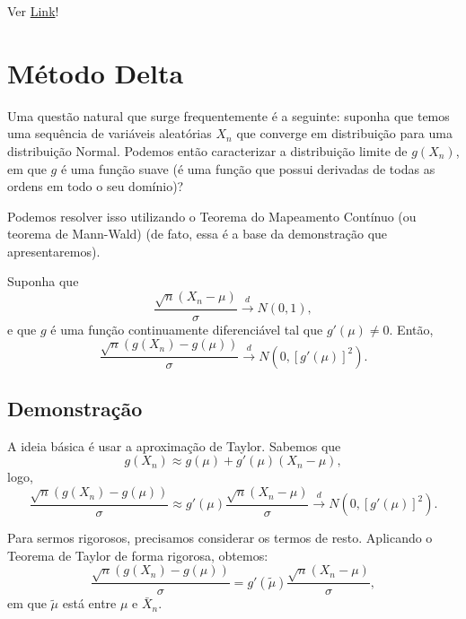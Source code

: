 \documentclass[
  letterpaper,
  DIV=11,
  numbers=noendperiod]{scrreprt}
\begin{document}
Ver
\href{https://www.ime.usp.br/~leorolla/probabilidade/Ch7.S1.html}{Link}!

\section{Método Delta}\label{muxe9todo-delta}

Uma questão natural que surge frequentemente é a seguinte: suponha que
temos uma sequência de variáveis aleatórias \(X_n\) que converge em
distribuição para uma distribuição Normal. Podemos então caracterizar a
distribuição limite de \(g(X_n)\), em que \(g\) é uma função suave (é
uma função que possui derivadas de todas as ordens em todo o seu
domínio)?

Podemos resolver isso utilizando o Teorema do Mapeamento Contínuo (ou
teorema de Mann-Wald) (de fato, essa é a base da demonstração que
apresentaremos).

\begin{tcolorbox}[enhanced jigsaw, colback=white, leftrule=.75mm, colbacktitle=quarto-callout-tip-color!10!white, breakable, titlerule=0mm, bottomtitle=1mm, title=\textcolor{quarto-callout-tip-color}{\faLightbulb}\hspace{0.5em}{Método Delta}, colframe=quarto-callout-tip-color-frame, toprule=.15mm, opacityback=0, bottomrule=.15mm, opacitybacktitle=0.6, arc=.35mm, toptitle=1mm, rightrule=.15mm, coltitle=black, left=2mm]

Suponha que
\[\frac{\sqrt{n}(X_n - \mu)}{\sigma} \xrightarrow{d} N(0,1),\] e que
\(g\) é uma função continuamente diferenciável tal que
\(g'(\mu) \neq 0\). Então,
\[\frac{\sqrt{n}(g(X_n) - g(\mu))}{\sigma} \xrightarrow{d} N\left(0, [g'(\mu)]^2\right).\]

\end{tcolorbox}

\subsection*{Demonstração}\label{demonstrauxe7uxe3o}

A ideia básica é usar a aproximação de Taylor. Sabemos que
\[g(X_n) \approx g(\mu) + g'(\mu)(X_n - \mu),\] logo,
\[\frac{\sqrt{n}(g(X_n) - g(\mu))}{\sigma}
\approx
g'(\mu)\frac{\sqrt{n}(X_n - \mu)}{\sigma}
\xrightarrow{d} N\left(0, [g'(\mu)]^2\right).\]

Para sermos rigorosos, precisamos considerar os termos de resto.
Aplicando o Teorema de Taylor de forma rigorosa, obtemos:
\[\frac{\sqrt{n}(g(X_n) - g(\mu))}{\sigma}
=
g'(\tilde{\mu})\frac{\sqrt{n}(X_n - \mu)}{\sigma},\] em que
\(\tilde{\mu}\) está entre \(\mu\) e \(\bar{X}_n\).
\end{document}
